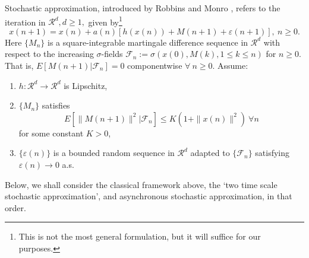 \documentclass[12pt]{article}
\numberwithin{equation}{section}
\newcommand{\R}{\mathcal{R}}
\newcommand{\F}{\mathcal{F}}
\newcommand{\1}{\textbf{1}}
\begin{document}
Stochastic approximation,  introduced by Robbins and Monro \cite{Robbins},  refers to the iteration in $\R^d, d \geq 1,$ given by\footnote{This is not the most general formulation, but it will suffice for our purposes.}
\begin{equation}
x(n+1) = x(n) + a(n)\left[h(x(n)) + M(n+1) + \varepsilon(n+1)\right], \ n \geq 0. \label{SA0}
\end{equation}
Here $\{M_n\}$ is a square-integrable martingale difference sequence in $\R^d$ with respect to the increasing $\sigma$-fields $\F_n := \sigma(x(0), M(k), 1 \leq k \leq n)$ for $n \geq 0$. That is,   $E\left[M(n+1)|\F_n\right] = 0$ componentwise $\forall \ n \geq 0$.
Assume:
\begin{enumerate}
\item $h: \R^d \to \R^d$ is Lipschitz,

\item $\{M_n\}$  satisfies
\begin{equation}
E\left[\|M(n+1)\|^2|\F_n\right] \leq K\left(1 + \|x(n)\|^2\right) \ \forall n \label{mgbound}
\end{equation}
for some constant $K > 0$,

\item $\{\varepsilon(n)\}$ is a bounded random sequence in $\R^d$ adapted to $\{\F_n\}$ satisfying $\varepsilon(n) \to 0$ a.s.
\end{enumerate}

Below, we shall consider the classical framework above, the `two time scale stochastic approximation', and asynchronous stochastic approximation, in that order.
\end{document}
